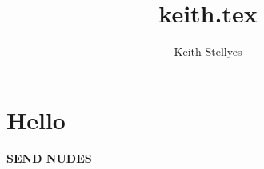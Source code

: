 \documentclass{article}
\title{keith.tex}
\author{Keith Stellyes}
\begin{document}
\maketitle

\section{Hello}
\centering
\textbf{\Huge SEND NUDES}
\end{document}

